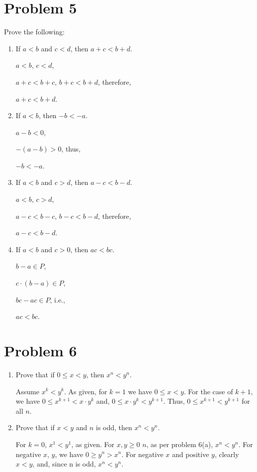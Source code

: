 \documentclass{article}
\begin{document}
\section{Problem 5}
Prove the following:
\begin{enumerate}
    \item If $a < b$ and $c <d$, then $a + c < b + d$.

        $a < b$, $c <d$,

        $a + c < b + c$, $b + c < b + d$, therefore,

        $a + c < b + d$.

    \item If $a < b$, then $-b < -a$.

        $a - b < 0$,

        $-(a - b) > 0$, thus,

        $-b < -a$.

    \item If $a < b$ and $c > d$, then $a - c < b - d$.

        $a < b$, $c > d$,

        $a - c < b - c$, $b - c < b - d$, therefore,

        $a - c < b - d$.

    \item If $a <b$ and $c > 0$, then $ac < bc$.

        $b - a \in P$,

        $c \cdot (b - a) \in P$,

        $bc - ac \in P$, i.e.,

        $ac < bc$.
\end{enumerate}

\section{Problem 6}
\begin{enumerate}

    \item Prove that if $0 \leq x < y$, then $x^n < y^n$.

        Assume $x^k < y^k $. As given, for $k=1$ we have $0 \leq x < y$. For the case of $k+1$, we have $0 \leq x^{k+1}  < x \cdot y^k$ and, $0 \leq x \cdot y^k < y^{k+1}$. Thus, $0 \leq x^{k+1} < y^{k+1}$ for all $n$.

    \item Prove that if $x < y$ and $n$ is odd, then $x^n < y^n$.

        For $k=0$, $x^1 < y^1$, as given. For $x, y \geq 0$ $n$, as per problem 6(a), $x^n < y^n$. For negative $x$, $y$, we have $0 \geq y^n > x^n$. For negative $x$ and positive $y$, clearly $x < y$, and, since n is odd, $x^n < y^n$.

\end{enumerate}
\end{document}
